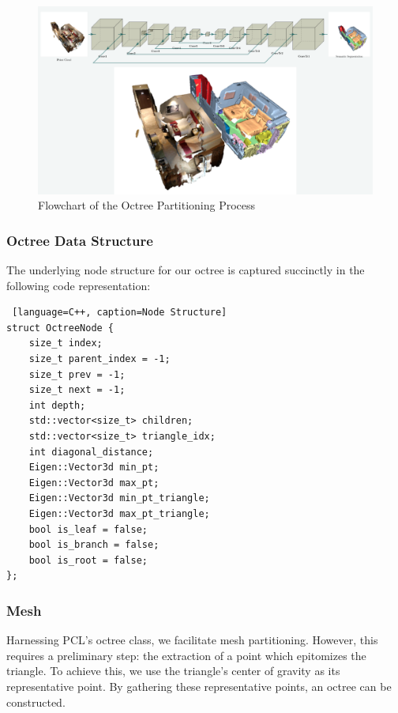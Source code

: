 \documentclass[11pt, a4paper,oneside,chapterprefix=false]{scrbook}
\begin{document}
\begin{minipage}{\textwidth}
	\begin{figure}[H]
		\centering
		\includegraphics*[width=1.0\textwidth]{figures/Minkowski Engine.png}
		\caption{Flowchart of the Octree Partitioning Process}
		\label{fig:flowchart of the octree partitioning process}
	\end{figure}
\end{minipage}

\subsubsection{Octree Data Structure}

The underlying node structure for our octree is captured succinctly in the following code representation:

\begin{lstlisting} [language=C++, caption=Node Structure]
struct OctreeNode {
    size_t index;
    size_t parent_index = -1;
    size_t prev = -1;
    size_t next = -1;
    int depth;
    std::vector<size_t> children;
    std::vector<size_t> triangle_idx;
    int diagonal_distance;
    Eigen::Vector3d min_pt;
    Eigen::Vector3d max_pt;
    Eigen::Vector3d min_pt_triangle;
    Eigen::Vector3d max_pt_triangle;
    bool is_leaf = false;
    bool is_branch = false;
    bool is_root = false;
};
\end{lstlisting}

\subsubsection{Mesh} \label{subsec:mesh octree}

Harnessing PCL's octree class, we facilitate mesh partitioning. However, this requires a preliminary step: the extraction of a point which epitomizes the triangle. To achieve this, we use the triangle's center of gravity as its representative point. By gathering these representative points, an octree can be constructed.
\end{document}

